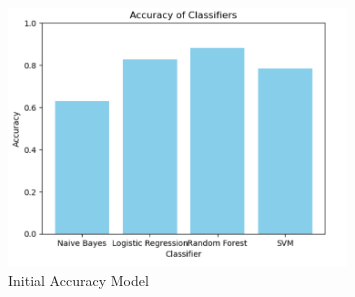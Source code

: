 \begin{figure}[h!]
	\centering
	\includegraphics[width=0.8\textwidth]{accuracy_model_init_result.png}
	\caption{Initial Accuracy Model}
	\label{fig:initial_accuracy_model}
\end{figure}

